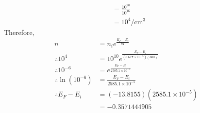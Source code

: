 \documentclass[fleqn, a4paper, 11pt, oneside]{amsart}
\theoremstyle{definition}
\theoremstyle{theorem}
\begin{document}
\begin{solution}
\begin{enumerate}[leftmargin=*]
\begin{align*}
                                  & = \frac{10^{20}}{10^{16}}             \\
                                  & = 10^4 \si{\per\centi\metre\cubed}
			\end{align*}
			Therefore,
			\begin{align*}
				n                                    & = n_i e^{\frac{E_F - E_i}{k T}}                                           \\
				\therefore 10^{4}                    & = 10^{10} e^{\frac{E_F - E_i}{\left( 8.617 \times 10^{-5} \right) (300)}} \\
				\therefore 10^{-6}                   & = e^{\frac{E_F - E_i}{2585.1 \times 10^{-5}}}                             \\
				\therefore \ln\left( 10^{-6} \right) & = \frac{E_F - E_i}{2585.1 \times 10^{-5}}                                 \\
				\therefore E_F - E_i                 & = (-13.8155) \left( 2585.1 \times 10^{-5} \right)                         \\
                                                                     & = -0.3571444905
			\end{align*}
	\end{enumerate}
\end{solution}
\end{document}
